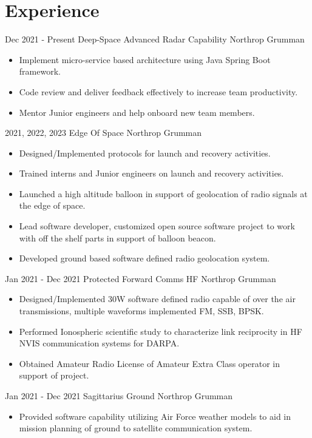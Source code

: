 \documentclass[]{src/friggeri-cv}
\begin{document}
\section{Experience}
\begin{entrylist}
  \entry
    {Dec 2021 - Present}
    {Deep-Space Advanced Radar Capability}
    {Northrop Grumman}
    {\begin{itemize}
        \item Implement micro-service based architecture using Java Spring Boot framework.
        \item Code review and deliver feedback effectively to increase team productivity.
        \item Mentor Junior engineers and help onboard new team members.
    \end{itemize}}
  \entry
    {2021, 2022, 2023}
    {Edge Of Space}
    {Northrop Grumman}
    {\begin{itemize}
        \item Designed/Implemented protocols for launch and recovery activities.
        \item Trained interns and Junior engineers on launch and recovery activities.
        \item Launched a high altitude balloon in support of geolocation of radio signals at the edge of space.
        \item Lead software developer, customized open source software project to work with off the shelf parts in support of balloon beacon.
        \item Developed ground based software defined radio geolocation system.
    \end{itemize}}
  \entry
    {Jan 2021 - Dec 2021}
    {Protected Forward Comms HF}
    {Northrop Grumman}
    {\begin{itemize}
        \item Designed/Implemented 30W software defined radio capable of over the air transmissions, multiple waveforms implemented FM, SSB, BPSK.
        \item Performed Ionospheric scientific study to characterize link reciprocity in HF NVIS communication systems for DARPA.
        \item Obtained Amateur Radio License of Amateur Extra Class operator in support of project.
    \end{itemize}}
  \entry
    {Jan 2021 - Dec 2021}
    {Sagittarius Ground}
    {Northrop Grumman}
    {\begin{itemize}
        \item Provided software capability utilizing Air Force weather models to aid in mission planning of ground to satellite communication system.

\end{itemize}}
\end{entrylist}
\end{document}
